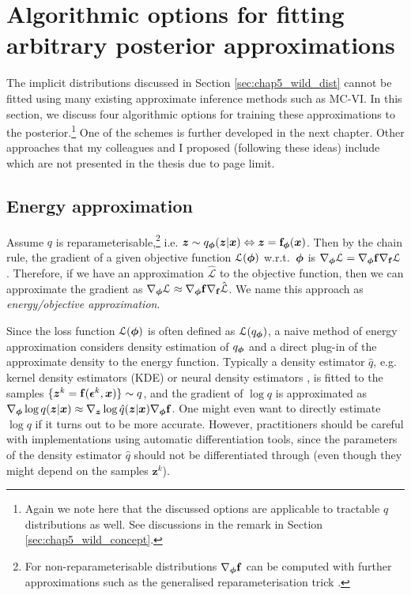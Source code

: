 \section{Algorithmic options for fitting arbitrary posterior approximations}
\label{sec:chap5_wild_solutions}
The implicit distributions discussed in Section \ref{sec:chap5_wild_dist} cannot be fitted using many existing approximate inference methods such as MC-VI. In this section, we discuss four algorithmic options for training these approximations to the posterior.\footnote{Again we note here that the discussed options are applicable to tractable $q$ distributions as well. See discussions in the remark in Section \ref{sec:chap5_wild_concept}.}
%
One of the schemes is further developed in the next chapter. Other approaches that my colleagues and I proposed (following these ideas) include \citet{li:dropout2017, li:amcmc2017} which are not presented in the thesis due to page limit. 

\subsection{Energy approximation}
Assume $q$ is reparameterisable,\footnote{For non-reparameterisable distributions $\nabla_{\bm{\phi}} \mathbf{f}$ can be computed with further approximations such as the generalised reparameterisation trick \citep{ruiz:generalized_reparam2016}.} i.e. $\bm{z} \sim q_{\bm{\phi}}(\bm{z}|\bm{x}) \Leftrightarrow \bm{z} = \mathbf{f}_{\bm{\phi}}(\bm{x})$.
%
Then by the chain rule, the gradient of a given objective function $\mathcal{L}(\bm{\phi})$ w.r.t.~$\bm{\phi}$ is $\nabla_{\bm{\phi}} \mathcal{L} = \nabla_{\bm{\phi}} \mathbf{f} \nabla_{\mathbf{f}} \mathcal{L} $. Therefore, if we have an approximation $\hat{\mathcal{L}}$ to the objective function, then we can approximate the gradient as $\nabla_{\bm{\phi}} \mathcal{L} \approx \nabla_{\bm{\phi}} \mathbf{f} \nabla_{\mathbf{f}} \hat{\mathcal{L}}$. We name this approach as \emph{energy/objective approximation}.

Since the loss function $\mathcal{L}(\bm{\phi})$ is often defined as $\mathcal{L}(q_{\bm{\phi}})$, a naive method of energy approximation considers density estimation of $q_{\bm{\phi}}$ and a direct plug-in of the approximate density to the energy function. Typically a density estimator $\hat{q}$, e.g. kernel density estimators (KDE) \citep{fukunaga:mean_shift1975} or neural density estimators \citep{mackay:density1999, larochelle:nade2011}, is fitted to the samples $\{\bm{z}^k = \mathbf{f}(\bm{\epsilon}^k, \bm{x}) \} \sim q$, and the gradient of $\log q$ is approximated as $\nabla_{\bm{\phi}} \log q(\bm{z}|\bm{x}) \approx \nabla_{\bm{z}} \log \hat{q}(\bm{z}|\bm{x}) \nabla_{\bm{\phi}} \mathbf{f}$. One might even want to directly estimate $\log q$ if it turns out to be more accurate. However, practitioners should be careful with implementations using automatic differentiation tools, since the parameters of the density estimator $\hat{q}$ should not be differentiated through (even though they might depend on the samples $\bm{z}^k$). 

